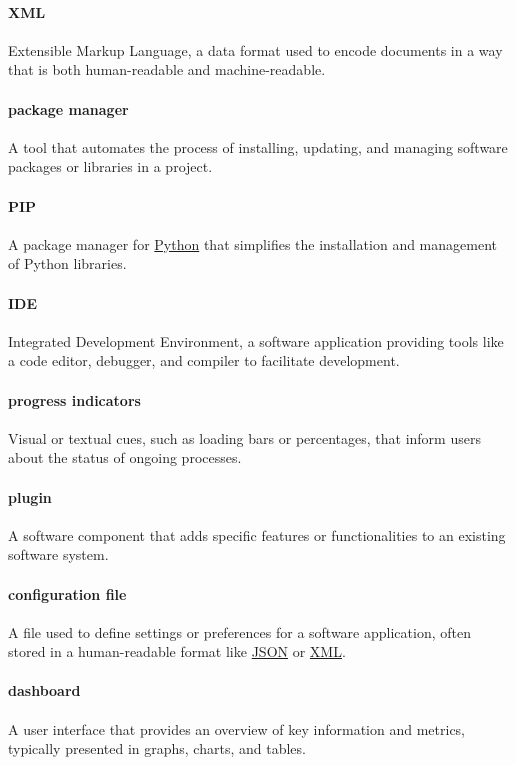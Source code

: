 \documentclass[12pt]{article}
\begin{document}
\paragraph*{XML}
\label{term:XML}
Extensible Markup Language, a data format used to encode documents in a way that is both human-readable and machine-readable.

\paragraph*{package manager}
A tool that automates the process of installing, updating, and managing software packages or libraries in a project.

\paragraph*{PIP}
A package manager for \hyperref[term:python]{Python} that simplifies the installation and management of Python libraries.

\paragraph*{IDE}
Integrated Development Environment, a software application providing tools like a code editor, debugger, and compiler to facilitate development.

\paragraph*{progress indicators}
Visual or textual cues, such as loading bars or percentages, that inform users about the status of ongoing processes.

\paragraph*{plugin}
A software component that adds specific features or functionalities to an existing software system.

\paragraph*{configuration file}
A file used to define settings or preferences for a software application, often stored in a human-readable format like \hyperref[term:JSON]{JSON} or \hyperref[term:XML]{XML}.

\paragraph*{dashboard}
A user interface that provides an overview of key information and metrics, typically presented in graphs, charts, and tables.
\end{document}

